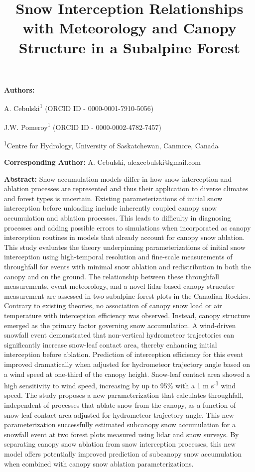 \documentclass[
  letterpaper,
  DIV=11,
  numbers=noendperiod]{scrartcl}
\title{Snow Interception Relationships with Meteorology and Canopy
Structure in a Subalpine Forest}
\author{}
\date{}
\begin{document}
\maketitle



\textbf{Authors:}

A. Cebulski\textsuperscript{1} (ORCID ID - 0000-0001-7910-5056)

J.W. Pomeroy\textsuperscript{1} (ORCID ID - 0000-0002-4782-7457)

\textsuperscript{1}Centre for Hydrology, University of Saskatchewan,
Canmore, Canada

\textbf{Corresponding Author:} A. Cebulski, alexcebulski@gmail.com

\textbf{Abstract:} Snow accumulation models differ in how snow
interception and ablation processes are represented and thus their
application to diverse climates and forest types is uncertain. Existing
parameterizations of initial snow interception before unloading include
inherently coupled canopy snow accumulation and ablation processes. This
leads to difficulty in diagnosing processes and adding possible errors
to simulations when incorporated as canopy interception routines in
models that already account for canopy snow ablation. This study
evaluates the theory underpinning parameterizations of initial snow
interception using high-temporal resolution and fine-scale measurements
of throughfall for events with minimal snow ablation and redistribution
in both the canopy and on the ground. The relationship between these
throughfall measurements, event meteorology, and a novel lidar-based
canopy strucutre measurement are assessed in two subalpine forest plots
in the Canadian Rockies. Contrary to existing theories, no association
of canopy snow load or air temperature with interception efficiency was
observed. Instead, canopy structure emerged as the primary factor
governing snow accumulation. A wind-driven snowfall event demonstrated
that non-vertical hydrometeor trajectories can significantly increase
snow-leaf contact area, thereby enhancing initial interception before
ablation. Prediction of interception efficiency for this event improved
dramatically when adjusted for hydrometeor trajectory angle based on a
wind speed at one-third of the canopy height. Snow-leaf contact area
showed a high sensitivity to wind speed, increasing by up to 95\% with a
1 m s\textsuperscript{-1} wind speed. The study proposes a new
parameterization that calculates throughfall, independent of processes
that ablate snow from the canopy, as a function of snow-leaf contact
area adjusted for hydrometeor trajectory angle. This new
parameterization successfully estimated subcanopy snow accumulation for
a snowfall event at two forest plots measured using lidar and snow
surveys. By separating canopy snow ablation from snow interception
processes, this new model offers potentially improved prediction of
subcanopy snow accumulation when combined with canopy snow ablation
parameterizations.
\end{document}
